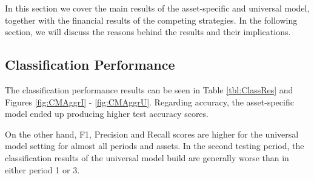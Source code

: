 \documentclass[12pt, a4paper]{article}
\begin{document}
In this section we cover the main results of the asset-specific and universal model, together with the financial results of the competing strategies. In the following section, we will discuss the reasons behind the results and their implications.

\subsection{Classification Performance}
\label{subsec:ER:ClassPerf}

The classification performance results can be seen in Table \ref{tbl:ClassRes} and Figures \ref{fig:CMAggrI} - \ref{fig:CMAggrU}.
Regarding accuracy, the asset-specific model ended up producing higher test accuracy scores. 

On the other hand, F1, Precision and Recall scores are higher for the universal model setting for almost all periods and assets. In the second testing period, the classification results of the universal model build are generally worse than in either period 1 or 3.
\end{document}
